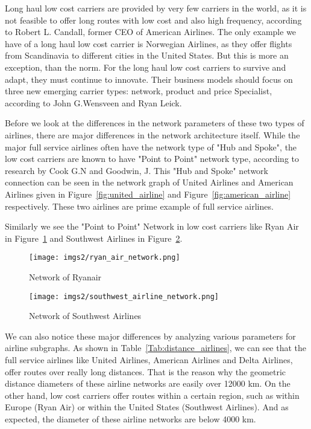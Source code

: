 \documentclass[twocolumn]{tum-article}
\begin{document}
Long haul low cost carriers are provided by very few carriers in the world, as it is not feasible to offer long routes with low cost and also high frequency, according to Robert L. Candall, former CEO of American Airlines.\cite{long_haul_lcc_model}
The only example we have of a long haul low cost carrier is Norwegian Airlines, as they offer flights from Scandinavia to different cities in the United States.
But this is more an exception, than the norm. For the long haul low cost carriers to survive and adapt, they must continue to innovate. Their business models should focus on three new emerging carrier types: network, product and price Specialist, according to John G.Wensveen and Ryan Leick.\cite{long_haul_lcc_new_model}


Before we look at the differences in the network parameters of these two types of airlines, there are major differences in the network architecture itself.
While the major full service airlines often have the network type of "Hub and Spoke", the low cost carriers are known to have "Point to Point" network type, according to research by Cook G.N and Goodwin, J.\cite{airline_network_comparison}
This "Hub and Spoke" network connection can be seen in the network graph of United Airlines and American Airlines given in Figure~\ref{fig:united_airline} and Figure~\ref{fig:american_airline} respectively. These two airlines are prime example of full service airlines. 


Similarly we see the "Point to Point" Network in low cost carriers like Ryan Air in Figure~\ref{fig:ryan_air} and Southwest Airlines in Figure~\ref{fig:southwest_airline}.

\begin{figure}
        \centering
        \texttt{[image: imgs2/ryan\_air\_network.png]}
        \caption{
Network of Ryanair}
        \label{fig:ryan_air}
\end{figure}

\begin{figure}
        \centering
        \texttt{[image: imgs2/southwest\_airline\_network.png]}
        \caption{
Network of Southwest Airlines}
        \label{fig:southwest_airline}
\end{figure}


We can also notice these major differences by analyzing various parameters for airline subgraphs.
As shown in Table~\ref{Tab:distance_airlines}, we can see that the full service airlines like United Airlines, American Airlines and Delta Airlines, offer routes over really long distances.
That is the reason why the geometric distance diameters of these airline networks are easily over 12000 km.
On the other hand, low cost carriers offer routes within a certain region, such as within Europe (Ryan Air) or within the United States (Southwest Airlines).
And as expected, the diameter of these airline networks are below 4000 km. 
\end{document}
